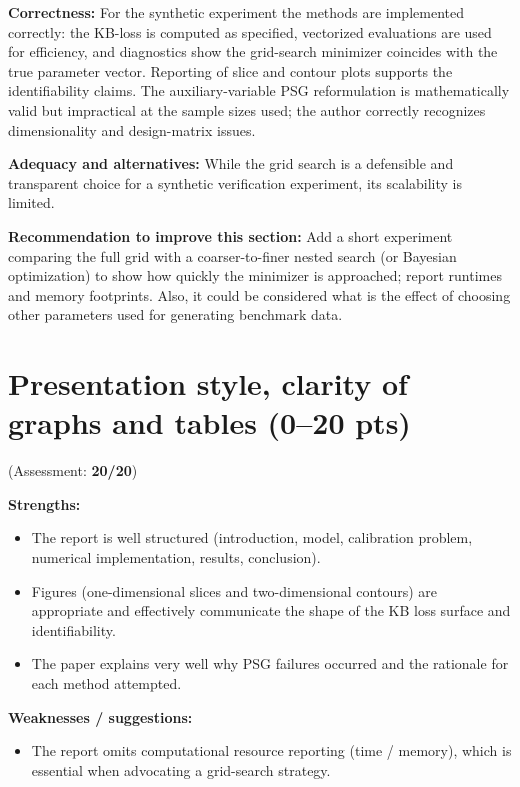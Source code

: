 \documentclass[11pt]{article}
\begin{document}
	\textbf{Correctness:} For the synthetic experiment the methods are implemented correctly: the KB-loss is computed as specified, vectorized evaluations are used for efficiency, and diagnostics show the grid-search minimizer coincides with the true parameter vector. Reporting of slice and contour plots supports the identifiability claims. The auxiliary-variable PSG reformulation is mathematically valid but impractical at the sample sizes used; the author correctly recognizes dimensionality and design-matrix issues.
	
	\textbf{Adequacy and alternatives:} While the grid search is a defensible and transparent choice for a synthetic verification experiment, its scalability is limited. 
	
	\textbf{Recommendation to improve this section:} Add a short experiment comparing the full grid with a coarser-to-finer nested search (or Bayesian optimization) to show how quickly the minimizer is approached; report runtimes and memory footprints. Also, it could be considered what is the effect of choosing other parameters used for generating benchmark data.
	
	\section{Presentation style, clarity of graphs and tables (0--20 pts)}
	(Assessment: \textbf{20/20})
	
	\textbf{Strengths:}
	\begin{itemize}
		\item The report is well structured (introduction, model, calibration problem, numerical implementation, results, conclusion).
		\item Figures (one-dimensional slices and two-dimensional contours) are appropriate and effectively communicate the shape of the KB loss surface and identifiability.
		\item The paper explains very well why PSG failures occurred and the rationale for each method attempted.
	\end{itemize}
	
	\textbf{Weaknesses / suggestions:}
	\begin{itemize}
		\item The report omits computational resource reporting (time / memory), which is essential when advocating a grid-search strategy.
	\end{itemize}
	
\end{document}

